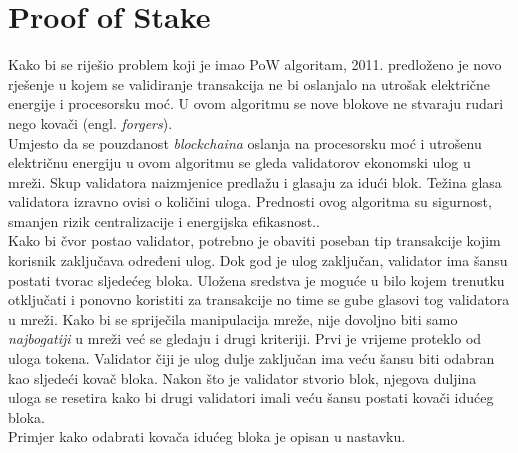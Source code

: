 \documentclass[times, utf8, zavrsni, numeric]{fer}
\begin{document}
\section{Proof of Stake}
Kako bi se riješio problem koji je imao PoW algoritam, 2011. predloženo je novo rješenje u kojem se validiranje transakcija ne bi oslanjalo na utrošak električne energije
i procesorsku moć. U ovom algoritmu se nove blokove ne stvaraju rudari nego kovači (engl. \emph{forgers}). \\ Umjesto da se pouzdanost \emph{blockchaina} oslanja
na procesorsku moć i utrošenu električnu energiju u ovom algoritmu se gleda validatorov ekonomski ulog u mreži. Skup validatora naizmjenice predlažu
i glasaju za idući blok. Težina glasa validatora izravno ovisi o količini uloga. Prednosti ovog algoritma su sigurnost, smanjen rizik centralizacije i 
energijska efikasnost.\citep{PoSGithub}. \\
Kako bi čvor postao validator, potrebno je obaviti poseban tip transakcije kojim korisnik zaključava određeni ulog. Dok god je ulog zaključan, validator ima šansu
postati tvorac sljedećeg bloka. Uložena sredstva je moguće u bilo kojem trenutku otključati i ponovno koristiti za transakcije no time se gube glasovi tog validatora u mreži.
Kako bi se spriječila manipulacija mreže, nije dovoljno biti samo \emph{najbogatiji} u mreži već se gledaju i drugi kriteriji. Prvi je vrijeme proteklo od uloga tokena.
Validator čiji je ulog dulje zaključan ima veću šansu biti odabran kao sljedeći kovač bloka. Nakon što je validator stvorio blok, njegova duljina uloga se resetira kako
bi drugi validatori imali veću šansu postati kovači idućeg bloka.\citep{posMedium} \\
Primjer kako  odabrati kovača idućeg bloka je opisan u nastavku\citep{posGraphic}. 
\end{document}
